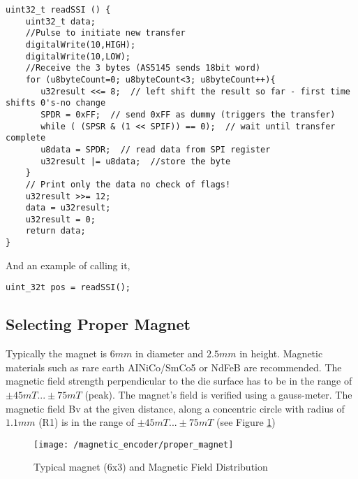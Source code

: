\begin{lstlisting}[style=My_Arduino, label=Arduino read pos,caption=Arduino function to read the position of the rotor]
uint32_t readSSI () {
    uint32_t data;
    //Pulse to initiate new transfer
    digitalWrite(10,HIGH);
    digitalWrite(10,LOW);
    //Receive the 3 bytes (AS5145 sends 18bit word)
    for (u8byteCount=0; u8byteCount<3; u8byteCount++){
       u32result <<= 8;  // left shift the result so far - first time shifts 0's-no change
       SPDR = 0xFF;  // send 0xFF as dummy (triggers the transfer)
       while ( (SPSR & (1 << SPIF)) == 0);  // wait until transfer complete
       u8data = SPDR;  // read data from SPI register
       u32result |= u8data;  //store the byte
    }
    // Print only the data no check of flags!
    u32result >>= 12;
    data = u32result;
    u32result = 0;
    return data;
}
\end{lstlisting}


\noindent And an example of calling it,

\begin{lstlisting}[style=My_Arduino,label = readSSI() call example, caption=readSSI() call example]
uint_32t pos = readSSI();
\end{lstlisting}

\subsection{Selecting Proper Magnet}

Typically the magnet is $6mm$ in diameter and $2.5mm$ in height. Magnetic materials such as rare earth AINiCo/SmCo5 or NdFeB are recommended. The magnetic field strength perpendicular to the die surface has to be in the range of $\pm45mT...\pm75mT$ (peak). The magnet's field is verified using a gauss-meter. The magnetic field Bv at the given distance, along a concentric circle with radius of $1.1mm$ (R1) is in the range of $\pm45mT...\pm75mT$ (see Figure \ref{Fig:Proper Magnet})

\begin{center}
\begin{figure}[h!]
	
		\texttt{[image: /magnetic\_encoder/proper\_magnet]}
		\caption{Typical magnet (6x3) and Magnetic Field Distribution}
		\label{Fig:Proper Magnet}
	
\end{figure}
\end{center}

\newpage

